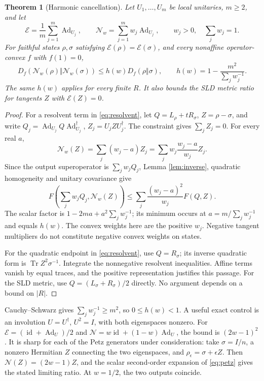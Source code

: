 \documentclass[11pt]{article}
\newcommand{\Tr}{\operatorname{Tr}}
\newcommand{\id}{\operatorname{id}}
\newcommand{\Ad}{\operatorname{Ad}}
\newcommand{\E}{\mathcal E}
\newcommand{\N}{\mathcal N}
\newtheorem{theorem}{Theorem}
\theoremstyle{remark}
\begin{document}
\begin{theorem}[Harmonic cancellation]\label{thm:harmonic}
Let \(U_1,\ldots,U_m\) be local unitaries, \(m\ge2\), and let
\[
 \E=\frac1m\sum_{j=1}^m\Ad_{U_j},\qquad
 \N_w=\sum_{j=1}^m w_j\Ad_{U_j},\qquad
 w_j>0,\quad \sum_jw_j=1.
\]
For faithful states \(\rho,\sigma\) satisfying \(\E(\rho)=\E(\sigma)\),
and every nonaffine operator-convex \(f\) with \(f(1)=0\),
\begin{equation}\label{eq:harmonic}
 D_f(\N_w(\rho)\Vert\N_w(\sigma))
 \le h(w)D_f(\rho\Vert\sigma),\qquad
 h(w)=1-\frac{m^2}{\sum_jw_j^{-1}}.
\end{equation}
The same \(h(w)\) applies for every finite \(R\).
It also bounds the SLD metric ratio for tangents \(Z\) with \(\E(Z)=0\).
\end{theorem}
\begin{proof}
For a resolvent term in \eqref{eq:resolvent}, let
\(Q=L_\rho+tR_\sigma\), \(Z=\rho-\sigma\), and write
\(Q_j=\Ad_{U_j}Q\Ad_{U_j}^\dagger\), \(Z_j=U_jZU_j^\dagger\).
The constraint gives \(\sum_jZ_j=0\).
For every real \(a\),
\[
 \N_w(Z)=\sum_j(w_j-a)Z_j
        =\sum_jw_j\frac{w_j-a}{w_j}Z_j.
\]
Since the output superoperator is \(\sum_jw_jQ_j\), Lemma \ref{lem:inverse}, quadratic homogeneity and unitary covariance give
\[
 F\left(\sum_jw_jQ_j,\N_w(Z)\right)
 \le \sum_j\frac{(w_j-a)^2}{w_j}F(Q,Z).
\]
The scalar factor is
\(1-2ma+a^2\sum_jw_j^{-1}\); its minimum occurs at
\(a=m/\sum_jw_j^{-1}\) and equals \(h(w)\).
The convex weights here are the positive \(w_j\). Negative tangent multipliers do not constitute negative convex weights on states.

For the quadratic endpoint in \eqref{eq:resolvent}, use \(Q=R_\sigma\); its inverse quadratic form is \(\Tr Z^2\sigma^{-1}\).
Integrate the nonnegative resolvent inequalities. Affine terms vanish by equal traces, and the positive representation justifies this passage.
For the SLD metric, use \(Q=(L_\sigma+R_\sigma)/2\) directly.
No argument depends on a bound on \(|R|\).
\end{proof}

Cauchy--Schwarz gives \(\sum_jw_j^{-1}\ge m^2\), so \(0\le h(w)<1\).
A useful exact control is an involution \(U=U^\dagger\), \(U^2=I\), with both eigenspaces nonzero. For \(\E=(\id+\Ad_U)/2\) and
\(\N=w\id+(1-w)\Ad_U\), the bound is \((2w-1)^2\).
It is sharp for each of the Petz generators under consideration: take
\(\sigma=I/n\), a nonzero Hermitian \(Z\) connecting the two eigenspaces, and
\(\rho_\epsilon=\sigma+\epsilon Z\).
Then \(\N(Z)=(2w-1)Z\), and the scalar second-order expansion of \eqref{eq:petz} gives the stated limiting ratio. At \(w=1/2\), the two outputs coincide.
\end{document}
